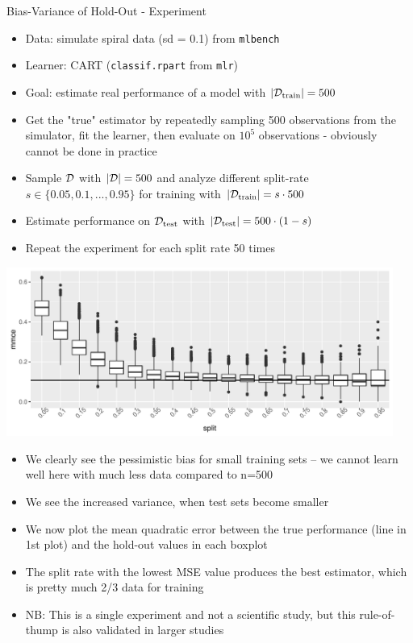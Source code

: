 \documentclass[11pt,compress,t,notes=noshow, xcolor=table]{beamer}
\begin{document}
\begin{vbframe}{Bias-Variance of Hold-Out - Experiment}
\begin{itemize}
\item Data: simulate spiral data (sd = 0.1) from \texttt{mlbench}
\item Learner: CART (\texttt{classif.rpart} from \texttt{mlr})
\item Goal: estimate real performance of a model with $|\mathcal{D}_{\text{train}}| = 500$
\item Get the "true" estimator by repeatedly sampling 500 observations from the simulator, fit the learner, then evaluate on $10^5$ observations - obviously cannot be done in practice
\item Sample $\mathcal{D}$ with $|\mathcal{D}| = 500$ and analyze different split-rate $s \in \{0.05, 0.1, ..., 0.95\}$ for training with $|\mathcal{D}_{\text{train}}| = s \cdot 500$
\item Estimate performance on $\mathcal{D}_{\text{test}}$ with $|\mathcal{D}_{\text{test}}| = 500 \cdot (1 - s)$
\item Repeat the experiment for each split rate 50 times
\end{itemize}

\framebreak

\begin{center}
\includegraphics[width=0.95\textwidth]{figure/test-holdout-example} 
\end{center}
\lz

\begin{itemize}
\item We clearly see the pessimistic bias for small training sets -- we cannot learn well here with much less data compared to n=500
\item We see the increased variance, when test sets become smaller
\end{itemize}

\framebreak

\begin{itemize}
  \item We now plot the mean quadratic error between the true performance (line in 1st plot) and the hold-out values in each boxplot
  \item The split rate with the lowest MSE value produces the best estimator, which is pretty much 2/3 data for training
  \item NB: This is a single experiment and not a scientific study, but this rule-of-thump is also validated in larger studies
\end{itemize}


\end{vbframe}
\end{document}
